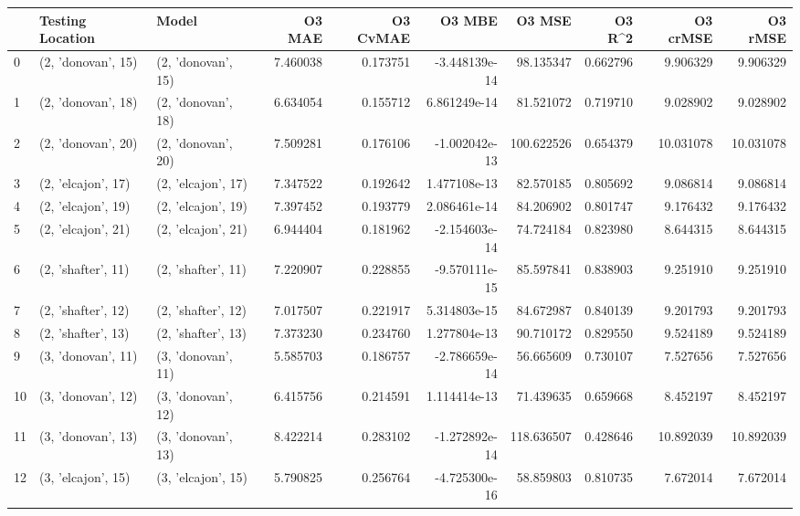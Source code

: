 \begin{tabular}{lllrrrrrrr}
\toprule
{} &    Testing Location &               Model &    O3 MAE &  O3 CvMAE &        O3 MBE &      O3 MSE &    O3 R\textasciicircum2 &   O3 crMSE &    O3 rMSE \\
\midrule
0  &  (2, 'donovan', 15) &  (2, 'donovan', 15) &  7.460038 &  0.173751 & -3.448139e-14 &   98.135347 &  0.662796 &   9.906329 &   9.906329 \\
1  &  (2, 'donovan', 18) &  (2, 'donovan', 18) &  6.634054 &  0.155712 &  6.861249e-14 &   81.521072 &  0.719710 &   9.028902 &   9.028902 \\
2  &  (2, 'donovan', 20) &  (2, 'donovan', 20) &  7.509281 &  0.176106 & -1.002042e-13 &  100.622526 &  0.654379 &  10.031078 &  10.031078 \\
3  &  (2, 'elcajon', 17) &  (2, 'elcajon', 17) &  7.347522 &  0.192642 &  1.477108e-13 &   82.570185 &  0.805692 &   9.086814 &   9.086814 \\
4  &  (2, 'elcajon', 19) &  (2, 'elcajon', 19) &  7.397452 &  0.193779 &  2.086461e-14 &   84.206902 &  0.801747 &   9.176432 &   9.176432 \\
5  &  (2, 'elcajon', 21) &  (2, 'elcajon', 21) &  6.944404 &  0.181962 & -2.154603e-14 &   74.724184 &  0.823980 &   8.644315 &   8.644315 \\
6  &  (2, 'shafter', 11) &  (2, 'shafter', 11) &  7.220907 &  0.228855 & -9.570111e-15 &   85.597841 &  0.838903 &   9.251910 &   9.251910 \\
7  &  (2, 'shafter', 12) &  (2, 'shafter', 12) &  7.017507 &  0.221917 &  5.314803e-15 &   84.672987 &  0.840139 &   9.201793 &   9.201793 \\
8  &  (2, 'shafter', 13) &  (2, 'shafter', 13) &  7.373230 &  0.234760 &  1.277804e-13 &   90.710172 &  0.829550 &   9.524189 &   9.524189 \\
9  &  (3, 'donovan', 11) &  (3, 'donovan', 11) &  5.585703 &  0.186757 & -2.786659e-14 &   56.665609 &  0.730107 &   7.527656 &   7.527656 \\
10 &  (3, 'donovan', 12) &  (3, 'donovan', 12) &  6.415756 &  0.214591 &  1.114414e-13 &   71.439635 &  0.659668 &   8.452197 &   8.452197 \\
11 &  (3, 'donovan', 13) &  (3, 'donovan', 13) &  8.422214 &  0.283102 & -1.272892e-14 &  118.636507 &  0.428646 &  10.892039 &  10.892039 \\
12 &  (3, 'elcajon', 15) &  (3, 'elcajon', 15) &  5.790825 &  0.256764 & -4.725300e-16 &   58.859803 &  0.810735 &   7.672014 &   7.672014 \\

\end{tabular}

